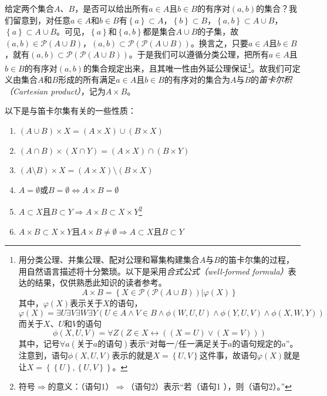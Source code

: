 \documentclass[../main.tex]{subfiles}
\begin{document}
给定两个集合$A$、$B$，是否可以给出所有$a\in A$且$b\in B$的有序对$\left(a,b\right)$的集合？我们留意到，对任意$a\in A$和$b\in B$有$\left\{a\right\}\subset A$，$\left\{b\right\}\subset B$，$\left\{a,b\right\}\subset A\cup B$，$\left\{a\right\}\subset A\cup B$。可见，$\left\{a\right\}$和$\left\{a,b\right\}$都是集合$A\cup B$的子集，故$\left(a,b\right)\in\mathcal{P}\left(A\cup B\right)$，$\left(a,b\right)\subset\mathcal{P}\left(\mathcal{P}\left(A\cup B\right)\right)$。换言之，只要$a\in A$且$b\in B$，就有$\left(a,b\right)\subset\mathcal{P}\left(\mathcal{P}\left(A\cup B\right)\right)$。于是我们可以遵循分类公理，把所有$a\in A$且$b\in B$的有序对$\left(a,b\right)$的集合规定出来，且其唯一性由外延公理保证\footnote{
    用分类公理、并集公理、配对公理和幂集构建集合$A$与$B$的笛卡尔集的过程，用自然语言描述将十分繁琐。以下是采用\emph{合式公式（well-formed formula）}表达的结果，仅供熟悉此知识的读者参考。
    \[A\times B=\left\{X\in\mathcal{P}\left(\mathcal{P}\left(A\cup B\right)\right)|\varphi\left(X\right)\right\}
    \]
    其中，$\varphi\left(X\right)$表示关于$X$的语句，
    \[
        \varphi\left(X\right)=\exists U\exists V\exists W \exists Y\left(U\in A \wedge V\in B\wedge \phi\left(W,U,U\right)\wedge\phi\left(Y,U,V\right)\wedge\phi\left(X,W,Y\right)\right)
    \]
    而关于$X$、$U$和$V$的语句
    \[
        \phi\left(X,U,V\right)=\forall Z\left(Z\in X\leftrightarrow\left(\left(X=U\right)\vee\left(X=V\right)\right)\right)
    \]
    其中，记号$\forall a\left(\text{关于$a$的语句}\right)$表示“对每一/任一满足关于$a$的语句规定的$a$”。注意到，语句$\phi\left(X,U,V\right)$表示的就是$X=\left\{U,V\right\}$这件事，故语句$\varphi\left(X\right)$就是让$X=\left\{\left\{U\right\},\left\{U,V\right\}\right\}$。
}。故我们可定义由集合$A$和$B$形成的所有满足$a\in A$且$b\in B$的有序对的集合为$A$与$B$的\emph{笛卡尔积（Cartesian product）}，记为$A\times B$。

以下是与笛卡尔集有关的一些性质：
\begin{enumerate}
    \item $\left(A\cup B\right)\times X=\left(A\times X\right)\cup\left(B\times X\right)$
    \item $\left(A\cap B\right)\times \left(X\cap Y\right)=\left(A\times X\right)\cap\left(B\times Y\right)$
    \item $\left(A\setminus B\right)\times X=\left(A\times X\right)\setminus \left(B\times X\right)$
    \item $A=\emptyset\text{或}B=\emptyset\Leftrightarrow A\times B=\emptyset$
    \item $A\subset X\text{且}B\subset Y\Rightarrow A\times B\subset X\times Y$\footnote{符号$\Rightarrow$的意义：（语句1）$\Rightarrow$（语句2）表示“若（语句1 ），则（语句2）。”}
    \item $A\times B\subset X\times Y\text{且}A\times B\neq\emptyset\Rightarrow A\subset X\text{且}B\subset Y$
\end{enumerate}
\end{document}
